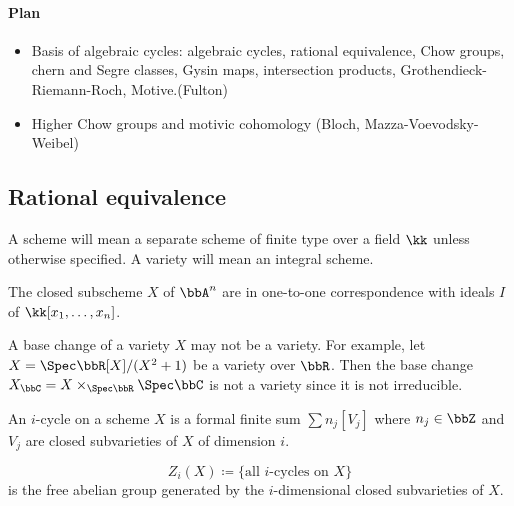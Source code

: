 \paragraph{Plan}
\begin{itemize}
    \item [I] Basis of algebraic cycles:
    algebraic cycles, rational equivalence, Chow groups, chern and Segre classes, Gysin maps, intersection products, Grothendieck-Riemann-Roch, Motive.(Fulton)
    \item[II] Higher Chow groups and motivic cohomology (Bloch, Mazza-Voevodsky-Weibel)
\end{itemize}

\subsection{Rational equivalence}

    A scheme will mean a separate scheme of finite type over a field \(\kk\) unless otherwise specified. 
    A variety will mean an integral scheme.

    \begin{example}
        The closed subscheme \(X\) of \(\bbA^n\) are in one-to-one correspondence with ideals \(I\) of \(\kk[x_1,\dots,x_n]\).
    \end{example}

    \begin{example}
        A base change of a variety \(X\) may not be a variety. 
        For example, let \(X = \Spec \bbR[X]/(X^2+1)\) be a variety over \(\bbR\). 
        Then the base change \(X_{\bbC} = X \times_{\Spec \bbR} \Spec \bbC\) is not a variety since it is not irreducible.
    \end{example}

    \begin{definition}
        An \(i\)-cycle on a scheme \(X\) is a formal finite sum \(\sum n_j [V_j]\) where \(n_j \in \bbZ\) and \(V_j\) are closed subvarieties of \(X\) of dimension \(i\).
    \end{definition}

    \begin{definition}
        \[ Z_i(X) \coloneqq \{\text{all } i\text{-cycles on } X\} \]
        is the free abelian group generated by the \(i\)-dimensional closed subvarieties of \(X\).
    \end{definition}

